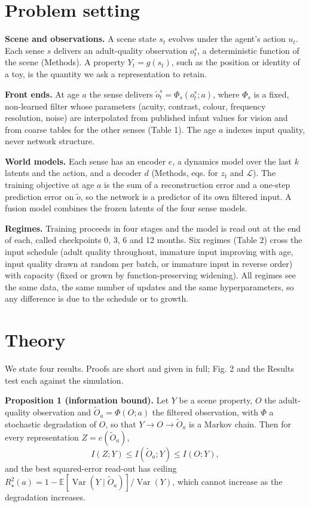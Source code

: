\documentclass{article}
\begin{document}
\section{Problem setting}

\textbf{Scene and observations.} A scene state \(s_t\) evolves under the agent's action \(u_t\). Each sense \(s\) delivers an adult-quality observation \(o_t^{s}\), a deterministic function of the scene (Methods). A property \(Y_t=g(s_t)\), such as the position or identity of a toy, is the quantity we ask a representation to retain.

\textbf{Front ends.} At age \(a\) the sense delivers \(\tilde o_t^{s}=\Phi_s(o_t^{s};a)\), where \(\Phi_s\) is a fixed, non-learned filter whose parameters (acuity, contrast, colour, frequency resolution, noise) are interpolated from published infant values for vision and from coarse tables for the other senses (Table 1). The age \(a\) indexes input quality, never network structure.

\textbf{World models.} Each sense has an encoder \(e\), a dynamics model over the last \(k\) latents and the action, and a decoder \(d\) (Methods, eqs. for \(z_t\) and \(\mathcal L\)). The training objective at age \(a\) is the sum of a reconstruction error and a one-step prediction error on \(\tilde o\), so the network is a predictor of its own filtered input. A fusion model combines the frozen latents of the four sense models.

\textbf{Regimes.} Training proceeds in four stages and the model is read out at the end of each, called checkpoints 0, 3, 6 and 12 months. Six regimes (Table 2) cross the input schedule (adult quality throughout, immature input improving with age, input quality drawn at random per batch, or immature input in reverse order) with capacity (fixed or grown by function-preserving widening). All regimes see the same data, the same number of updates and the same hyperparameters, so any difference is due to the schedule or to growth.

\section{Theory}

We state four results. Proofs are short and given in full; Fig. 2 and the Results test each against the simulation.

\textbf{Proposition 1 (information bound).} Let \(Y\) be a scene property, \(O\) the adult-quality observation and \(\tilde O_a=\Phi(O;a)\) the filtered observation, with \(\Phi\) a stochastic degradation of \(O\), so that \(Y\to O\to\tilde O_a\) is a Markov chain. Then for every representation \(Z=e(\tilde O_a)\),
\begin{equation}I(Z;Y)\le I(\tilde O_a;Y)\le I(O;Y),\end{equation}
and the best squared-error read-out has ceiling \(R^2_\star(a)=1-\mathbb E[\operatorname{Var}(Y\mid\tilde O_a)]/\operatorname{Var}(Y)\), which cannot increase as the degradation increases.
\end{document}
